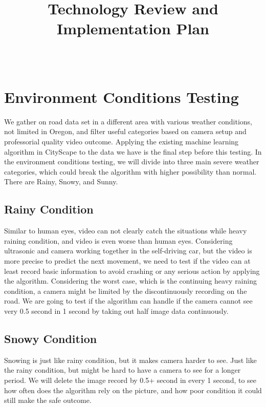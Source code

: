 \documentclass[10pt,draftclsnofoot,onecolumn,journal,compsoc]{IEEEtran}
\title{Technology Review and Implementation Plan}
\author{
  \IEEEauthorblockN{Team (Group 32) name: Teaching AutoPilot to Dodge\\ Author: Xilun Guo\\Team members: Basil Al Zamil and Tanner Fry} \\
  \IEEEauthorblockA{CS 461: Senior Capstone Fall 2016 \\ Oregon State University}
}
\date{}
\begin{document}
\maketitle
\IEEEdisplaynontitleabstractindextext
\IEEEpeerreviewmaketitle

\newpage

\tableofcontents

\newpage

\section{Environment Conditions Testing}
We gather on road data set in a different area with various weather conditions, not limited in Oregon, and filter useful categories based on camera setup and professorial quality video outcome. Applying the existing machine learning algorithm in CityScape to the data we have is the final step before this testing. In the environment conditions testing, we will divide into three main severe weather categories, which could break the algorithm with higher possibility than normal. There are Rainy, Snowy, and Sunny.

\subsection{Rainy Condition}
Similar to human eyes, video can not clearly catch the situations while heavy raining condition, and video is even worse than human eyes. Considering ultrasonic and camera working together in the self-driving car, but the video is more precise to predict the next movement, we need to test if the video can at least record basic information to avoid crashing or any serious action by applying the algorithm. Considering the worst case, which is the continuing heavy raining condition, a camera might be limited by the discontinuously recording on the road. We are going to test if the algorithm can handle if the camera cannot see very 0.5 second in 1 second by taking out half image data continuously.    

\subsection{Snowy Condition}
Snowing is just like rainy condition, but it makes camera harder to see. Just like the rainy condition, but might be hard to have a camera to see for a longer period. We will delete the image record by 0.5+ second in every 1 second, to see how often does the algorithm rely on the picture, and how poor condition it could still make the safe outcome. 
\end{document}
